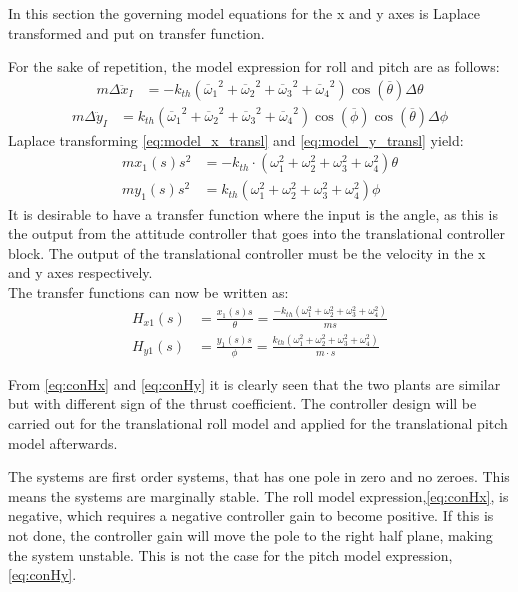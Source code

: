 In this section the governing model equations for the x and y axes is Laplace transformed and put on transfer function. 

For the sake of repetition, the model expression for roll and pitch are as follows:
\begin{align}
m\Delta\ddot{x}_I&= -k_{th}({\overline{\omega}_1}^2+{\overline{\omega}_2}^2+{\overline{\omega}_3}^2+{\overline{\omega}_4}^2)\cos(\overline{\theta})\Delta\theta \label{eq:model_x_transl}
\end{align}
\begin{align}
m\Delta\ddot{y}_I&= k_{th}({\overline{\omega}_1}^2+{\overline{\omega}_2}^2+{\overline{\omega}_3}^2+{\overline{\omega}_4}^2)\cos(\overline{\phi})\cos(\overline{\theta})\Delta\phi 
\label{eq:model_y_transl}
\end{align} 
Laplace transforming \autoref{eq:model_x_transl} and \ref{eq:model_y_transl} yield:
\begin{align}
m x_1(s)s^2&=-k_{th}\cdot (\omega_1 ^2 + \omega_2 ^2 + \omega_3 ^2 + \omega_4 ^2) \theta\\
m y_1(s) s^2&= k_{th} (\omega_1 ^2 + \omega_2 ^2 + \omega_3 ^2 + \omega_4 ^2)\phi
\end{align}
It is desirable to have a transfer function where the input is the angle, as this is the output from the attitude controller that goes into the translational controller block. The output of the translational controller must be the velocity in the x and y axes respectively. \\
The transfer functions can now be written as:
\begin{align}
H_{x1}(s)&=\frac{x_1(s) s}{\theta}=\frac{-k_{th} (\omega_1 ^2 + \omega_2 ^2 + \omega_3 ^2 + \omega_4 ^2)}{m s}\label{eq:conHx}\\
H_{y1}(s)&=\frac{y_1(s) s}{\phi}=\frac{k_{th}(\omega_1 ^2 + \omega_2 ^2 + \omega_3 ^2 + \omega_4 ^2)}{m\cdot s}
\end{align}
\begin{where}
\end{where}

From \autoref{eq:conHx} and \ref{eq:conHy} it is clearly seen that the two plants are similar but with different sign of the thrust coefficient. The controller design will be carried out for the translational roll model and applied for the translational pitch model  afterwards.

The systems are first order systems, that has one pole in zero and no zeroes. This means the systems are marginally stable. The roll model expression,\autoref{eq:conHx}, is negative, which requires a negative controller gain to become positive. If this is not done, the controller gain will move the pole to the right half plane, making the system unstable. This is not the case for the pitch model expression, \autoref{eq:conHy}.  

